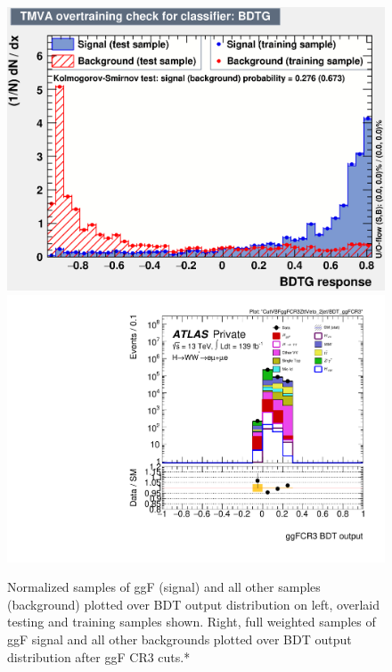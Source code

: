 \begin{figure}[!htbp]
\centering
  \includegraphics[width=.4\linewidth]{Pictures/ggFCR3/overtrain_BDTG.eps}
  \includegraphics[width=.45\linewidth]{Pictures/run2-emme-CutVBFggFCR3ZttVeto_2jet-BDT_ggFCR3-log.pdf}
\caption{Normalized samples of ggF (signal) and all other samples (background) plotted over BDT output distribution on left, overlaid testing and training samples shown. Right, full weighted samples of ggF signal and all other backgrounds plotted over BDT output distribution after ggF CR3 cuts.*}
\label{fig:ggFCR3BDTresult}
\end{figure}

%


